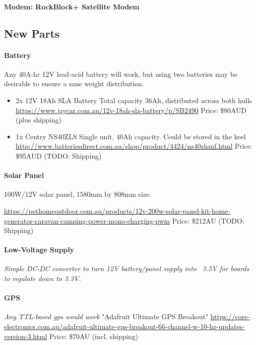 \paragraph{Modem: RockBlock+ Satellite Modem}

\subsection{New Parts}

\paragraph{Battery}
Any 40A-hr 12V lead-acid battery will work, but using two batteries may be desirable to ensure a sane weight distribution.

\begin{itemize}
\item{2x 12V 18Ah SLA Battery} 
Total capacity 36Ah, distributed across both hulls
\url{https://www.jaycar.com.au/12v-18ah-sla-battery/p/SB2490}
Price: \$80AUD (plus shipping)

\item{1x Centry NS40ZLS}
Single unit, 40Ah capacity. Could be stored in the keel 
\url{http://www.batteriesdirect.com.au/shop/product/4424/ns40zlsmf.html}
Price: \$95AUD (TODO: Shipping)
\end{itemize}

\paragraph{Solar Panel}
100W/12V solar panel, 1580mm by 808mm size. 

\url{https://pethomeoutdoor.com.au/products/12v-200w-solar-panel-kit-home-generator-caravan-camping-power-mono-charging-pwm}
Price: \$212AU (TODO: Shipping)

\paragraph{Low-Voltage Supply}
\emph{Simple DC-DC converter to turn 12V battery/panel supply into ~3.5V for boards to regulate down to 3.3V.}

\paragraph{GPS}
\emph{Any TTL-based gps would work}
"Adafruit Ultimate GPS Breakout"
\url{https://core-electronics.com.au/adafruit-ultimate-gps-breakout-66-channel-w-10-hz-updates-version-3.html}
Price: \$70AU (incl. shipping)

